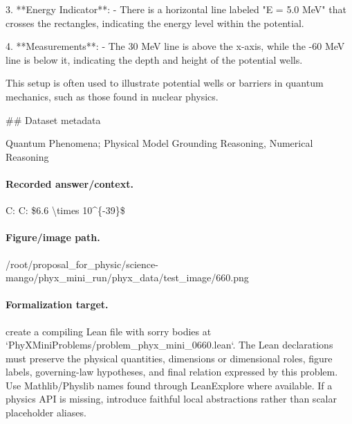 3. **Energy Indicator**:
   - There is a horizontal line labeled "E = 5.0 MeV" that crosses the rectangles, indicating the energy level within the potential.

4. **Measurements**:
   - The 30 MeV line is above the x-axis, while the -60 MeV line is below it, indicating the depth and height of the potential wells.

This setup is often used to illustrate potential wells or barriers in quantum mechanics, such as those found in nuclear physics.

\#\# Dataset metadata

Quantum Phenomena; Physical Model Grounding Reasoning, Numerical Reasoning

\paragraph{Recorded answer/context.}
C: C: \$6.6 \textbackslash{}times 10\textasciicircum{}\{-39\}\$

\paragraph{Figure/image path.}
/root/proposal\_for\_physic/science-mango/phyx\_mini\_run/phyx\_data/test\_image/660.png

\paragraph{Formalization target.}
create a compiling Lean file with sorry bodies at `PhyXMiniProblems/problem\_phyx\_mini\_0660.lean`. The Lean declarations must preserve the physical quantities, dimensions or dimensional roles, figure labels, governing-law hypotheses, and final relation expressed by this problem.
Use Mathlib/Physlib names found through LeanExplore where available. If a physics API is missing, introduce faithful local abstractions rather than scalar placeholder aliases.


